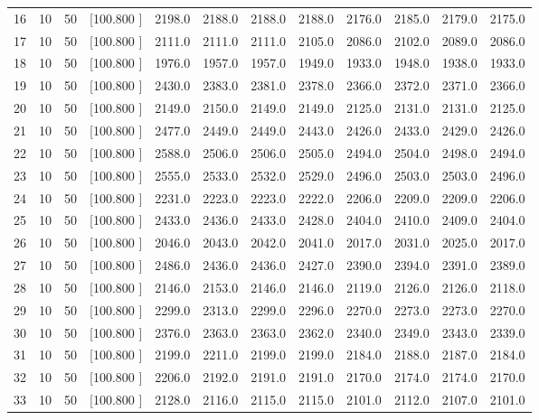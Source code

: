 \documentclass[12pt,a4paper]{article}
\begin{document}
\begin{center}
{\begin{tabular}{r r r r r r r r r r r r}
  16& 10& 50&[100.800   ]&  2198.0&  2188.0&  2188.0&  2188.0&  2176.0&  2185.0&  2179.0&  2175.0\\[-0.02in]
  17& 10& 50&[100.800   ]&  2111.0&  2111.0&  2111.0&  2105.0&  2086.0&  2102.0&  2089.0&  2086.0\\[-0.02in]
  18& 10& 50&[100.800   ]&  1976.0&  1957.0&  1957.0&  1949.0&  1933.0&  1948.0&  1938.0&  1933.0\\[-0.02in]
  19& 10& 50&[100.800   ]&  2430.0&  2383.0&  2381.0&  2378.0&  2366.0&  2372.0&  2371.0&  2366.0\\[-0.02in]
  20& 10& 50&[100.800   ]&  2149.0&  2150.0&  2149.0&  2149.0&  2125.0&  2131.0&  2131.0&  2125.0\\[-0.02in]
  21& 10& 50&[100.800   ]&  2477.0&  2449.0&  2449.0&  2443.0&  2426.0&  2433.0&  2429.0&  2426.0\\[-0.02in]
  22& 10& 50&[100.800   ]&  2588.0&  2506.0&  2506.0&  2505.0&  2494.0&  2504.0&  2498.0&  2494.0\\[-0.02in]
  23& 10& 50&[100.800   ]&  2555.0&  2533.0&  2532.0&  2529.0&  2496.0&  2503.0&  2503.0&  2496.0\\[-0.02in]
  24& 10& 50&[100.800   ]&  2231.0&  2223.0&  2223.0&  2222.0&  2206.0&  2209.0&  2209.0&  2206.0\\[-0.02in]
  25& 10& 50&[100.800   ]&  2433.0&  2436.0&  2433.0&  2428.0&  2404.0&  2410.0&  2409.0&  2404.0\\[-0.02in]
  26& 10& 50&[100.800   ]&  2046.0&  2043.0&  2042.0&  2041.0&  2017.0&  2031.0&  2025.0&  2017.0\\[-0.02in]
  27& 10& 50&[100.800   ]&  2486.0&  2436.0&  2436.0&  2427.0&  2390.0&  2394.0&  2391.0&  2389.0\\[-0.02in]
  28& 10& 50&[100.800   ]&  2146.0&  2153.0&  2146.0&  2146.0&  2119.0&  2126.0&  2126.0&  2118.0\\[-0.02in]
  29& 10& 50&[100.800   ]&  2299.0&  2313.0&  2299.0&  2296.0&  2270.0&  2273.0&  2273.0&  2270.0\\[-0.02in]
  30& 10& 50&[100.800   ]&  2376.0&  2363.0&  2363.0&  2362.0&  2340.0&  2349.0&  2343.0&  2339.0\\[-0.02in]
  31& 10& 50&[100.800   ]&  2199.0&  2211.0&  2199.0&  2199.0&  2184.0&  2188.0&  2187.0&  2184.0\\[-0.02in]
  32& 10& 50&[100.800   ]&  2206.0&  2192.0&  2191.0&  2191.0&  2170.0&  2174.0&  2174.0&  2170.0\\[-0.02in]
  33& 10& 50&[100.800   ]&  2128.0&  2116.0&  2115.0&  2115.0&  2101.0&  2112.0&  2107.0&  2101.0\\[-0.02in]

\end{tabular}}
\end{center}
\end{document}
